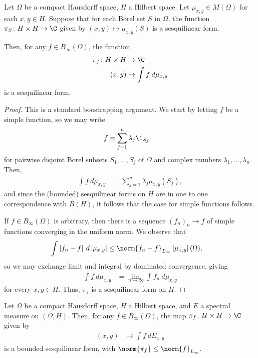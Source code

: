 \documentclass[10pt]{mypackage}
\begin{document}
\begin{lemma}
  Let $\Omega$ be a compact Hausdorff space, $H$ a Hilbert space. Let $\mu_{x,y}\in M(\Omega)$ for each $x,y\in H$. Suppose that for each Borel set $S$ in $\Omega$, the function $\pi_S\colon H\times H\rightarrow \C$ given by $\left( x,y \right)\mapsto \mu_{x,y}\left( S \right)$ is a sesquilinear form.

  Then, for any $f\in B_{\infty}(\Omega)$, the function
  \begin{align*}
    \pi_f\colon H\times H&\rightarrow \C\\
    \left( x,y \right) &\mapsto \int_{}^{} f\:d\mu_{x,y}
  \end{align*}
  is a sesquilinear form.
\end{lemma}
\begin{proof}
  This is a standard boostrapping argument. We start by letting $f$ be a simple function, so we may write
  \begin{align*}
    f &= \sum_{j=1}^{n}\lambda_j\1_{S_j}
  \end{align*}
  for pairwise disjoint Borel subsets $S_1,\dots,S_j$ of $\Omega$ and complex numbers $\lambda_1,\dots,\lambda_n$. Then,
  \begin{align*}
    \int_{}^{} f\:d\mu_{x,y} &= \sum_{j=1}^{n} \lambda_j\mu_{x,y}\left( S_j \right),
  \end{align*}
  and since the (bounded) sesquilinear forms on $H$ are in one to one correspondence with $B(H)$, it follows that the case for simple functions follows.

  If $f\in B_{\infty}(\Omega)$ is arbitrary, then there is a sequence $\left( f_n \right)_n\rightarrow f$ of simple functions converging in the uniform norm. We observe that
  \begin{align*}
    \int_{}^{} \left\vert f_n-f \right\vert\:d\left\vert \mu_{x,y} \right\vert &\leq \norm{f_n-f}_{L_{\infty}} \left\vert \mu_{x,y} \right\vert(\Omega),
  \end{align*}
  so we may exchange limit and integral by dominated convergence, giving
  \begin{align*}
    \int_{}^{} f\:d\mu_{x,y} &= \lim_{n\rightarrow\infty} \int_{}^{} f_n\:d\mu_{x,y}
  \end{align*}
  for every $x,y\in H$. Thus, $\pi_f$ is a sesquilinear form on $H$.
\end{proof}
\begin{theorem}
  Let $\Omega$ be a compact Hausdorff space, $H$ a Hilbert space, and $E$ a spectral measure on $\left( \Omega,H \right)$. Then, for any $f\in B_{\infty}(\Omega)$, the map $\pi_f\colon H\times H\rightarrow \C$ given by
  \begin{align*}
    \left( x,y \right) &\mapsto \int_{}^{} f\:dE_{x,y}
  \end{align*}
  is a bounded sesquilinear form, with $\norm{\pi_f}\leq \norm{f}_{L_{\infty}}$.
\end{theorem}
\end{document}
